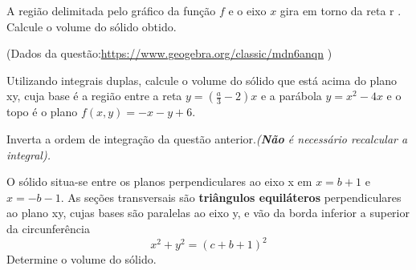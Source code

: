 \documentclass[11pt]{exam}
\begin{document}
\begin{questions}
  \large
  \addpoints

  \question[2\half] A região delimitada pelo gráfico da função $f$ e o eixo $x$ gira em torno da reta r . Calcule o volume do sólido obtido.

  (Dados da questão:\url{https://www.geogebra.org/classic/mdn6anqn} )
  \vfill

  \question[2\half] Utilizando integrais duplas, calcule o volume do sólido que está acima do plano xy, cuja base é a região entre a reta $y=(\frac{a}{3}-2)x$ e a parábola $y=x^2-4x$  e o topo é o plano $f(x,y)=-x-y+6$.

  \vfill

  \question[2\half] Inverta a ordem de integração da questão anterior.\textit{(\textbf{Não} é necessário recalcular a integral).}
  \vfill

  \question[2\half] O sólido situa-se entre os planos perpendiculares ao eixo x em $x=b+1$ e $x=-b-1$. As seções transversais são \textbf{triângulos equiláteros} perpendiculares ao plano xy, cujas bases são paralelas ao eixo y, e vão da borda inferior a superior da circunferência $$x^2+y^2=(c+b+1)^2$$ Determine o volume do sólido.

  \vfill

\end{questions}
\end{document}
